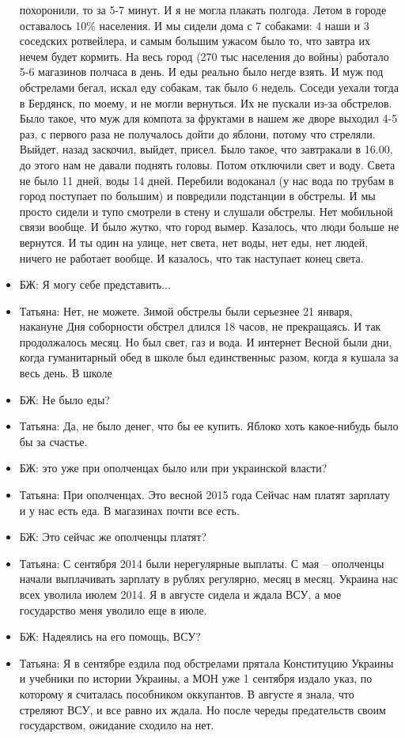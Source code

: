 \begin{itemize}
похоронили, то за 5-7 минут. И я не могла плакать полгода. Летом в городе
оставалось 10\% населения. И мы сидели дома с 7 собаками: 4 наши и 3 соседских
ротвейлера, и самым большим ужасом было то, что завтра их нечем будет кормить.
На весь город (270 тыс населения до войны) работало 5-6 магазинов полчаса в
день. И еды реально было негде взять. И муж под обстрелами бегал, искал еду
собакам, так было 6 недель. Соседи уехали тогда в Бердянск, по моему, и не
могли вернуться. Их не пускали из-за обстрелов. Было такое, что муж для компота
за фруктами в нашем же дворе выходил 4-5 раз, с первого раза не получалось
дойти до яблони, потому что стреляли. Выйдет, назад заскочил, выйдет, присел.
Было такое, что завтракали в 16.00, до этого нам не давали поднять головы.
Потом отключили свет и воду. Света не было 11 дней, воды 14 дней. Перебили
водоканал (у нас вода по трубам в город поступает по большим) и повредили
подстанции в обстрелы. И мы просто сидели и тупо смотрели в стену и слушали
обстрелы. Нет мобильной связи вообще. И было жутко, что город вымер. Казалось,
что люди больше не вернутся. И ты один на улице, нет света, нет воды, нет еды,
нет людей, ничего не работает вообще. И казалось, что так наступает конец
света.
\item БЖ: Я могу себе представить...
\item Татьяна: Нет, не можете. Зимой обстрелы были серьезнее 21 января, накануне Дня соборности обстрел длился 18 часов, не прекращаясь. И так продолжалось месяц. Но был свет, газ и вода. И интернет Весной были дни, когда гуманитарный обед в школе был единственныс разом, когда я кушала за весь день. В школе
\item БЖ: Не было еды?
\item Татьяна: Да, не было денег, что бы ее купить. Яблоко хоть какое-нибудь было бы за счастье.
\item БЖ: это уже при ополченцах было или при украинской власти?
\item Татьяна: При ополченцах. Это весной 2015 года Сейчас нам платят зарплату и у нас есть еда. В магазинах почти все есть.
\item БЖ: Это сейчас же ополченцы платят?
\item Татьяна: С сентября 2014 были нерегулярные выплаты. С мая – ополченцы начали выплачивать зарплату в рублях регулярно, месяц в месяц. Украина нас всех уволила июлем 2014. Я в августе сидела и ждала ВСУ, а мое государство меня уволило еще в июле.
\item БЖ: Надеялись на его помощь, ВСУ?
\item Татьяна: Я в сентябре ездила под обстрелами прятала Конституцию Украины и учебники по истории Украины, а МОН уже 1 сентября издало указ, по которому я считалась пособником оккупантов. В августе я знала, что стреляют ВСУ, и все равно их ждала. Но после череды предательств своим государством, ожидание сходило на нет.

\end{itemize}
